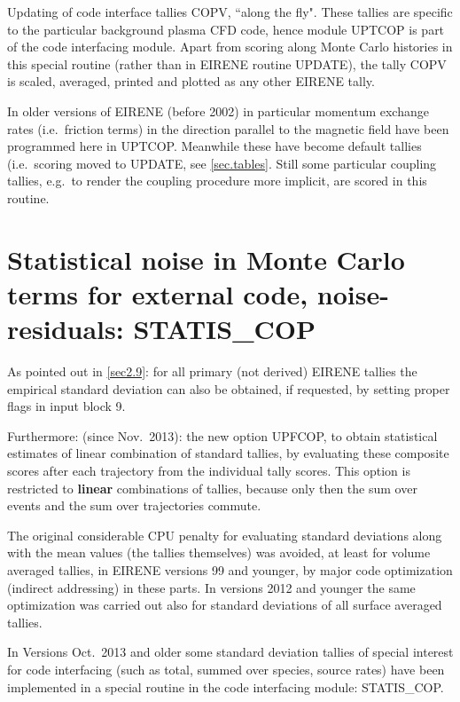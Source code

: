Updating of code interface tallies COPV, ``along the fly".
These tallies are specific to the particular background plasma \ac{CFD} code,
hence module UPTCOP is part of the code interfacing module.
Apart from scoring along Monte Carlo histories in this special routine (rather
than in EIRENE routine UPDATE), the tally COPV is scaled, averaged, printed and
plotted as any other EIRENE tally.

In older versions of EIRENE (before 2002) in particular momentum exchange rates
(i.e.\ friction terms) in the direction parallel to the magnetic field have
been programmed here in UPTCOP.
Meanwhile these have become default tallies (i.e.\ scoring moved to UPDATE, see
\cref{sec.tables}.
Still some particular coupling tallies, e.g.\ to render the coupling procedure
more implicit, are scored in this routine.

\newpage

\section{Statistical noise in Monte Carlo terms for external code, noise-residuals: STATIS\_COP}
\label{sec4.4}

As pointed out in \cref{sec2.9}:  for all primary (not derived) EIRENE tallies
the empirical standard deviation can also be obtained, if requested, by setting
proper flags in input block 9.

Furthermore: (since Nov.\ 2013): the new option UPFCOP, to obtain statistical
estimates of linear combination of standard tallies, by evaluating these
composite scores after each trajectory from the individual tally scores.
This option is restricted to \textbf{linear} combinations of tallies, because
only then the sum over events and the sum over trajectories commute.

The original considerable CPU penalty for evaluating standard deviations along
with the mean values (the tallies themselves) was avoided, at least for volume
averaged tallies, in EIRENE versions 99 and younger, by major code optimization
(indirect addressing) in these parts.
In versions 2012 and younger the same optimization was carried out also for
standard deviations of all surface averaged tallies.

In Versions  Oct.\ 2013 and older some standard deviation tallies of special
interest for code interfacing (such as total, summed over species, source
rates) have been implemented in a special routine in the code interfacing
module: STATIS\_COP.

